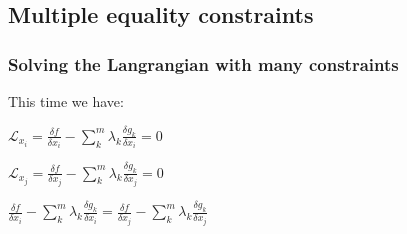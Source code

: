
\subsection{Multiple equality constraints}

\subsubsection{Solving the Langrangian with many constraints}

This time we have:

$\mathcal{L}_{x_i}=\frac{\delta f}{\delta x_i}-\sum^m_k\lambda_k \frac{\delta g_k}{\delta x_i}=0$

$\mathcal{L}_{x_j}=\frac{\delta f}{\delta x_j}-\sum^m_k\lambda_k \frac{\delta g_k}{\delta x_j}=0$

$\frac{\delta f}{\delta x_i}-\sum^m_k\lambda_k \frac{\delta g_k}{\delta x_i}=\frac{\delta f}{\delta x_j}-\sum^m_k\lambda_k \frac{\delta g_k}{\delta x_j}$

